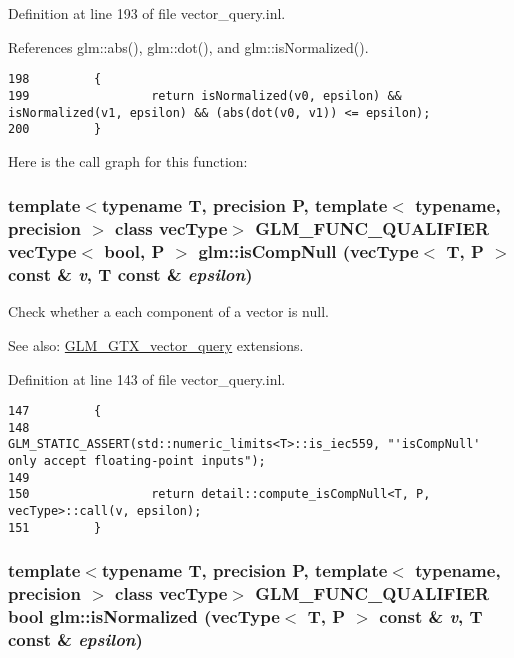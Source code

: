 Definition at line 193 of file vector\_\-query.inl.

References glm::abs(), glm::dot(), and glm::isNormalized().

\begin{Code}\begin{verbatim}198         {
199                 return isNormalized(v0, epsilon) && isNormalized(v1, epsilon) && (abs(dot(v0, v1)) <= epsilon);
200         }
\end{verbatim}
\end{Code}




Here is the call graph for this function:\hypertarget{group__gtx__vector__query_g91e10972d2d748d78f0a5f6234f8b088}{
\subsubsection[isCompNull]{\setlength{\rightskip}{0pt plus 5cm}template$<$typename T, precision P, template$<$ typename, precision $>$ class vecType$>$ GLM\_\-FUNC\_\-QUALIFIER vecType$<$ bool, P $>$ glm::isCompNull (vecType$<$ T, P $>$ const \& {\em v}, \/  T const \& {\em epsilon})}}
\label{group__gtx__vector__query_g91e10972d2d748d78f0a5f6234f8b088}


Check whether a each component of a vector is null. \begin{Desc}
\item[See also:]\hyperlink{group__gtx__vector__query}{GLM\_\-GTX\_\-vector\_\-query} extensions. \end{Desc}


Definition at line 143 of file vector\_\-query.inl.

\begin{Code}\begin{verbatim}147         {
148                 GLM_STATIC_ASSERT(std::numeric_limits<T>::is_iec559, "'isCompNull' only accept floating-point inputs");
149 
150                 return detail::compute_isCompNull<T, P, vecType>::call(v, epsilon);
151         }
\end{verbatim}
\end{Code}


\hypertarget{group__gtx__vector__query_g70f64c6df21ad40303809d76b1474fbe}{
\subsubsection[isNormalized]{\setlength{\rightskip}{0pt plus 5cm}template$<$typename T, precision P, template$<$ typename, precision $>$ class vecType$>$ GLM\_\-FUNC\_\-QUALIFIER bool glm::isNormalized (vecType$<$ T, P $>$ const \& {\em v}, \/  T const \& {\em epsilon})}}
\label{group__gtx__vector__query_g70f64c6df21ad40303809d76b1474fbe}


